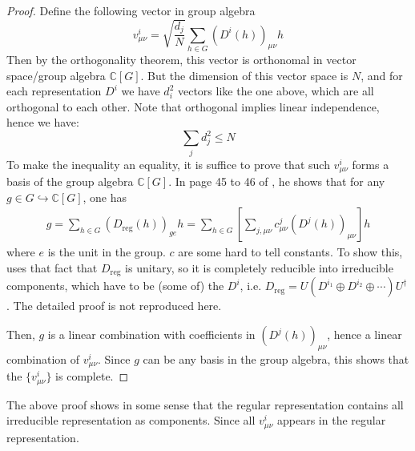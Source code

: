 \begin{proof}
    Define the following vector in group algebra
    \begin{equation}
        v^{i}_{\mu\nu} = \sqrt{\frac{d_j}{N}} \sum_{h\in G}
        \left(D^i(h)\right)_{\mu\nu} h
    \end{equation}
    Then by the orthogonality theorem, this vector is orthonomal in
    vector space/group algebra $\mathbb{C}[G]$. But the dimension of
    this vector space is $N$, and for each representation $D^i$ we
    have $d_i^2$ vectors like the one above, which are all orthogonal
    to each other. Note that orthogonal implies linear independence,
    hence we have:
        $$\sum_{j} d_j^2 \leq N $$
    To make the inequality an equality, it is suffice to prove that
    such $v^{i}_{\mu\nu}$ forms a basis of the group algebra
    $\mathbb{C}[G]$. In page 45 to 46 of \cite{Ludeling}, he shows
    that for any $g\in G\hookrightarrow \mathbb{C}[G]$, one has
    \begin{align}
        g = \sum_{h\in G} \left(D_\text{reg}(h)\right)_{ge} h
        = \sum_{h\in G} \left[ \sum_{j,\mu\nu} c^j_{\mu\nu}
        \left(D^j(h)\right)_{\mu\nu}\right] h
    \end{align}
    where $e$ is the unit in the group. $c$ are some hard to tell
    constants. To show this, \cite{Ludeling} uses that fact that
    $D_\text{reg}$ is unitary, so it is completely reducible into
    irreducible components, which have to be (some of) the $D^i$,
    i.e. $D_\text{reg}= U(D^{i_1}\oplus D^{i_2}\oplus
    \cdots)U^\dagger$. The detailed proof is not reproduced here.

    Then, $g$ is a linear combination with
    coefficients in $\left(D^j(h)\right)_{\mu\nu}$, hence a linear
    combination of $v^i_{\mu\nu}$. Since $g$ can be any basis in the
    group algebra, this shows that the $\{v^i_{\mu\nu}\}$ is complete.
\end{proof}
\begin{remark}
    The above proof shows in some sense that the regular
    representation contains all irreducible representation as
    components. Since all $v^i_{\mu\nu}$ appears in the regular
    representation.
\end{remark}

